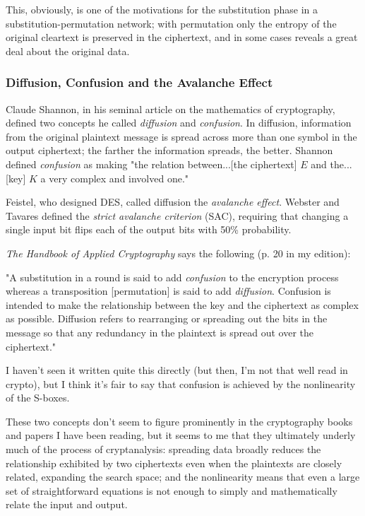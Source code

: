 \documentclass[%
 aip,
 jmp,%
 amsmath,amssymb,
 reprint,%
]{revtex4-1}
\begin{document}
This, obviously, is one of the motivations for the substitution phase
in a substitution-permutation network; with permutation only the
entropy of the original cleartext is preserved in the ciphertext, and
in some cases reveals a great deal about the original data.

\subsubsection{Diffusion, Confusion and the Avalanche Effect}

Claude Shannon, in his seminal article on the mathematics of
cryptography, defined two concepts he called \emph{diffusion} and
\emph{confusion}.  In diffusion, information from the original plaintext
message is spread across more than one symbol in the output
ciphertext; the farther the information spreads, the better.  Shannon
defined \emph{confusion} as making "the relation between...[the ciphertext]
$E$ and the...[key] $K$ a very complex and involved one."

Feistel, who designed DES, called diffusion the \emph{avalanche effect}.
Webster and Tavares defined the \emph{strict avalanche criterion} (SAC),
requiring that changing a single input bit flips each of the output
bits with 50\% probability.

\emph{The Handbook of Applied Cryptography} says the following (p. 20 in my
edition):

"A substitution in a round is said to add \emph{confusion} to the
encryption process whereas a transposition [permutation] is said to
add \emph{diffusion}. Confusion is intended to make the relationship
between the key and the ciphertext as complex as possible.  Diffusion
refers to rearranging or spreading out the bits in the message so that
any redundancy in the plaintext is spread out over the ciphertext."

I haven't seen it written quite this directly (but then, I'm not that
well read in crypto), but I think it's fair to say that confusion is
achieved by the nonlinearity of the S-boxes.

These two concepts don't seem to figure prominently in the
cryptography books and papers I have been reading, but it seems to me
that they ultimately underly much of the process of cryptanalysis:
spreading data broadly reduces the relationship exhibited by two
ciphertexts even when the plaintexts are closely related, expanding
the search space; and the nonlinearity means that even a large set of
straightforward equations is not enough to simply and mathematically
relate the input and output.
\end{document}
